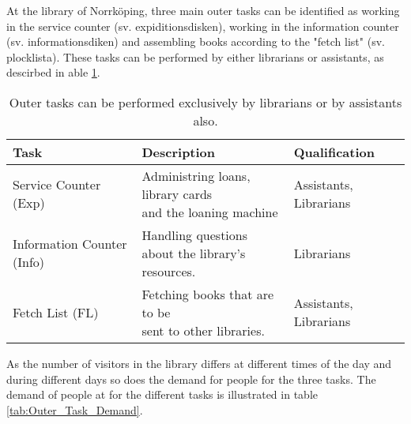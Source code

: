 At the library of Norrköping, three main outer tasks can be identified as working in the service counter (sv. expiditionsdisken), working in the information counter (sv. informationsdiken)  and assembling books according to the "fetch list" (sv. plocklista). These tasks can be performed by either librarians or assistants, as descirbed in able \ref{tab:Outer_Tasks}.

\begin{table}[h]
\centering
\caption{Outer tasks can be performed exclusively by librarians or by assistants also.}
\label{tab:Outer_Tasks}
\begin{tabularx}{\textwidth}{|X|l|X|}
\hline
\large{\textbf{Task}} & \large{\textbf{Description}} & \large{\textbf{Qualification}}\\ \hline 
Service Counter (Exp)  & \specialcell[t]{Administring loans, library cards\\ and the loaning machine} & Assistants, Librarians
\\ \hline
Information Counter (Info) & \specialcell[t]{Handling questions \\about the library's resources.} & Librarians
\\ \hline 
Fetch List (FL) & \specialcell[t]{Fetching books that are to be \\sent to other libraries.} & Assistants, Librarians
\\ \hline 
\end{tabularx}
\end{table} 

As the number of visitors in the library differs at different times of the day and during different days so does the demand for people for the three tasks. The demand of people at for the different tasks is illustrated in table \ref{tab:Outer_Task_Demand}. 




